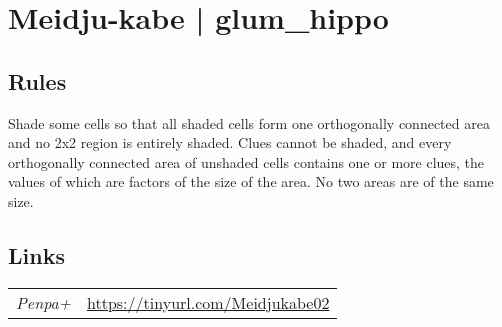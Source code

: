 \section{Meidju-kabe | {\normalfont glum\_hippo}}
\label{sec:19-meidju-kabe-glum-hippo}

\subsection*{Rules}
\begin{markdown}
Shade some cells so that all shaded cells form one orthogonally connected area and no 2x2 region is entirely shaded. Clues cannot be shaded, and every orthogonally connected area of unshaded cells contains one or more clues, the values of which are factors of the size of the area. No two areas are of the same size.
\end{markdown}
\subsection*{Links}
\begin{tabularx}{\textwidth}{l X}
\emph{Penpa+} & \url{https://tinyurl.com/Meidjukabe02} \\
\end{tabularx}
\pagebreak
